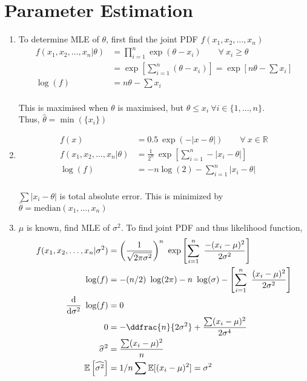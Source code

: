 \chapter{Parameter Estimation}

\begin{enumerate}
	
	\item 
		To determine MLE of $ \theta $, first find the joint PDF $ f(x_1, x_2, \dots, x_n) $ \\
		\begin{align}
			f(x_1, x_2, \dots, x_n | \theta) &= \prod_{i=1}^{n} \exp(\theta-x_i) \qquad \forall\ x_i \geq \theta \nonumber \\
			&= \exp \left[ \sum\limits_{i=1}^{n} (\theta - x_i) \right] = \exp \left[n\theta - \sum x_i\right] \nonumber \\
			\log (f) &= n\theta - \sum x_i		
		\end{align} \\
		This is maximised when $ \theta $ is maximised, but $ \theta \leq x_i\ \forall i \in \{1,\dots, n\} $.\\
		Thus, $ \widehat{\theta} = \min(\{x_i\}) $ \\
	
	
	\item 
		\begin{align}
			f(x) &= 0.5\ \exp\left(-|x- \theta|\right) \qquad \forall\ x \in \mathbb{R} \nonumber \\
			f(x_1, x_2, \dots, x_n | \theta) &= \frac{1}{2^n}\ \exp\left[ \sum\limits_{i=1}^{n} -|x_i - \theta| \right] \nonumber \\
			\log (f) &= -n\log (2) - \sum\limits_{i=1}^{n} |x_i - \theta| 
		\end{align}
	 \\
	
	
	$ \sum |x_i - \theta| $ is total absolute error. This is minimized by $ \widehat{\theta} = \mathrm{median}(x_1, \dots, x_n)$\\
	
	\item $ \mu $ is known, find MLE of $ \sigma^2 $. To find joint PDF and thus likelihood function, \\
	
	
		\begin{align}
			f(x_1, x_2, \dots, x_n | \sigma^2) &= \left(\frac{1}{\sqrt{2\pi\sigma^2}}\right)^n\ \exp \left[\sum\limits_{i=1}^{n}\ \frac{-(x_i - \mu)^2}{2\sigma^2}\right] \nonumber \\
			\log(f) &= -(n/2)\ \log(2\pi) - n\ \log(\sigma) - \left[\sum\limits_{i=1}^{n}\ \frac{(x_i - \mu)^2}{2\sigma^2}\right] \\
			\frac{\mathrm{d}}{\mathrm{d} \sigma^2}\ \log(f) &= 0 \nonumber \\
			0 &= -\ddfrac{n}{2\sigma^2} + \frac{\sum (x_i - \mu)^2}{2\sigma^4} \nonumber \\
			\widehat{\sigma}^2 &= \frac{\sum (x_i - \mu)^2}{n} \\
			\mathbb{E}\left[\widehat{\sigma^2}\right] &= 1/n \sum \mathbb{E}[(x_i - \mu)^2] = \sigma^2
		\end{align}\\
	

\end{enumerate}
